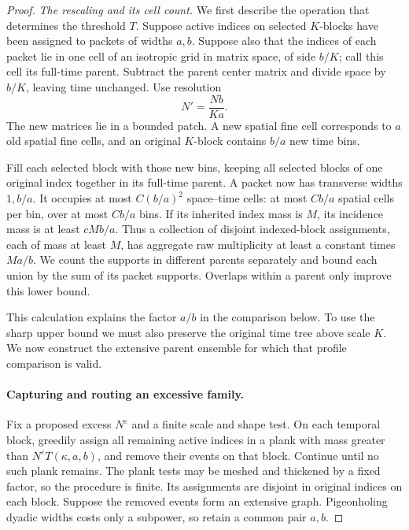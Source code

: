 \begin{proof}
\emph{The rescaling and its cell count.}
We first describe the operation that determines the threshold $T$.
Suppose active indices on selected $K$-blocks have been assigned
to packets of widths $a,b$.  Suppose also that the indices of each packet lie in one cell
of an isotropic grid in matrix space, of side $b/K$; call this cell
its full-time parent.  Subtract the parent center matrix and divide
space by $b/K$, leaving time unchanged.  Use resolution
\begin{equation}
 N'=\frac{Nb}{Ka}.
 \label{loc:isotropic-resolution}
\end{equation}
The new matrices lie in a bounded patch.  A new spatial fine cell
corresponds to $a$ old spatial fine cells, and an original $K$-block
contains $b/a$ new time bins.

Fill each selected block with those new bins, keeping all selected
blocks of one original index together in its full-time parent.
A packet now has transverse widths $1,b/a$.  It occupies at most
$C(b/a)^2$ space--time cells: at most $Cb/a$ spatial cells per bin,
over at most $Cb/a$ bins.  If its inherited index mass is $M$, its
incidence mass is at least $cMb/a$.  Thus a collection of disjoint
indexed-block assignments, each of mass at least $M$, has aggregate
raw multiplicity at least a constant times $Ma/b$.  We count the
supports in different parents separately and bound each union by the
sum of its packet supports.  Overlaps within a parent only improve
this lower bound.

This calculation explains the factor $a/b$ in the comparison below.
To use the sharp upper bound we must also preserve the original time
tree above scale $K$.  We now construct the extensive parent ensemble
for which that profile comparison is valid.

\paragraph{Capturing and routing an excessive family.}
Fix a proposed excess $N^\varepsilon$ and a finite scale and shape
test.  On each temporal block, greedily assign all remaining active
indices in a plank with mass greater than
$N^\varepsilon T(\kappa,a,b)$, and remove their events on that
block.  Continue until no such plank remains.  The plank tests may
be meshed and thickened by a fixed factor, so the procedure is finite.
Its assignments are disjoint in original indices on each block.
Suppose the removed events form an extensive graph.  Pigeonholing
dyadic widths costs only a subpower, so retain a common pair $a,b$.


\end{proof}
